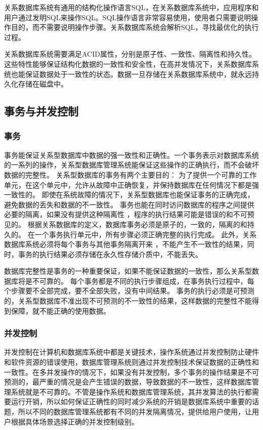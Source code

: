 关系数据库系统有通用的结构化操作语言SQL，在关系数据库系统中，应用程序和用户通过发明SQL来操作SQL。SQL操作语言非常容易使用，使用者只需要说明操作目的，而不需要说明操作步骤。关系数据库系统会解析SQL，寻找最优化的执行过程。

关系数据库系统需要满足ACID属性，分别是原子性、一致性、隔离性和持久性。这些特性能够保证结构化数据的一致性和安全性，在高并发情况下，关系数据库系统也能保证数据处于一致性的状态。数据一旦存储在关系数据库系统中，就永远持久化存储在磁盘中。
\subsection{事务与并发控制}
\subsubsection{事务}
事务能保证关系型数据库中数据的强一致性和正确性。一个事务表示对数据库系统的一系列的操作，关系型数据库管理系统能保证这些操作的正确执行，而不会破坏数据的完整性。
关系型数据库的事务有两个主要目的：
为了提供一个可靠的工作单元，在这个单元中，允许从故障中正确恢复，并保持数据库在任何情况下都是强一致性的。
即使在系统故障的情况下，关系型数据库也能保证事务的正确完成，避免数据的丢失和数据的不一致性。
事务也能在同时访问数据库的程序之间提供必要的隔离，如果没有提供这种隔离性
，程序的执行结果可能是错误的和不可预见的。
根据关系数据库的定义，数据库事务必须是原子的，一致的，隔离的和持久的。
在一个事务执行单元中，所有步骤必须正确完整的执行完成。
此外，关系数据库系统必须将每个事务与其他事务隔离开来
，不能产生不一致性的结果，同时，事务的执行结果必须存储在永久性存储介质中，不能丢失。

数据库完整性是事务的一种重要保证，如果不能保证数据的一致性，那么关系型数据库将是不可靠的。
每个事务都是不同的执行步骤组成，在事务执行过程中，每个步骤要不全部完成，要不全部失败，没有中间结果。
事务的执行必须是可预测的，关系型数据库不准出现不可预测的不一致性的结果，这样数据的完整性不能得到保障，就不能正确的使用数据。
\subsubsection{并发控制}
并发控制在计算机和数据库系统中都是关键技术，操作系统通过并发控制防止硬件和软件资源的错误使用，数据库管理系统则通过并发控制技术保证数据的正确性和一致性。在多并发操作的情况下，如果没有并发控制，多个事务的操作结果是不可预测的，最严重的情况是会产生错误的数据，导致数据的不一致性，这样数据库管理系统就是不可靠的。不管是操作系统和数据库管理系统，其并发算法的执行都需要运行开销，所以如何保证正确性的同时减少系统的开销是数据库系统中重要的话题，所以不同的数据库管理系统都有不同的并发隔离情况，提供给用户使用，让用户根据具体场景选择正确的并发控制级别。

